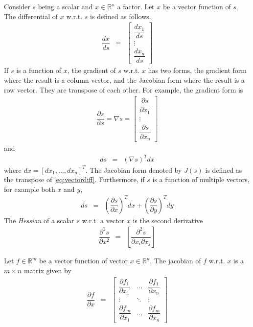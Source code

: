 Consider $s$ being a scalar and $x\in\mathbb{R}^n$ a factor. Let $x$ be a vector function of $s$. The differential of $x$ w.r.t. $s$ is defined as follows.
\begin{eqnarray}
  \dfrac{dx}{ds} &=& \left[\begin{array}{c}
                             \dfrac{dx_1}{ds} \\
                             \vdots \\
                             \dfrac{dx_n}{ds}
                           \end{array}\right] \nonumber
\end{eqnarray}
If $s$ is a function of $x$, the gradient of $s$ w.r.t. $x$ has two forms, the gradient form where the result is a column vector, and the Jacobian form where the result is a row vector. They are transpose of each other. For example, the gradient form is
\begin{eqnarray}
   \dfrac{\partial s}{\partial x} = \nabla s 
  = \left[\begin{array}{c}
           \dfrac{\partial s}{\partial x_1} \\
           \vdots \\
           \dfrac{\partial s}{\partial x_n}
           \end{array}\right] \label{eq:vectordiff}
\end{eqnarray}
and
\begin{eqnarray}
ds &=& \left(\nabla s\right)^Tdx \nonumber
\end{eqnarray}
where $dx = [dx_1, \ldots, dx_n]^T$. The Jacobian form denoted by $J(s)$ is defined as the transpose of \eqref{eq:vectordiff}. Furthermore, if $s$ is a function of multiple vectors, for example both $x$ and $y$,
\begin{eqnarray}
ds &=& \left(\dfrac{\partial s}{\partial x}\right)^Tdx + \left(\dfrac{\partial s}{\partial y}\right)^Tdy \nonumber
\end{eqnarray}
The \textit{Hessian} of a scalar $s$ w.r.t. a vector $x$ is the second derivative
\begin{eqnarray}
  \dfrac{\partial^2s}{\partial x^2} &=& \left[\dfrac{\partial^2s}{\partial x_i \partial x_j}\right] \nonumber
\end{eqnarray}

Let $f\in\mathbb{R}^{m}$ be a vector function of vector $x\in\mathbb{R}^{n}$. The jacobian of $f$ w.r.t. $x$ is a $m\times n$ matrix given by
\begin{eqnarray}
  \dfrac{\partial f}{\partial x} &=& \left[\begin{array}{ccc}
                                             \dfrac{\partial f_1}{\partial x_1} & \ldots & \dfrac{\partial f_1}{\partial x_n} \\
                                             \vdots & \ddots & \vdots \\
                                             \dfrac{\partial f_m}{\partial x_1} & \ldots & \dfrac{\partial f_m}{\partial x_n}
                                           \end{array}\right] \nonumber
\end{eqnarray}


